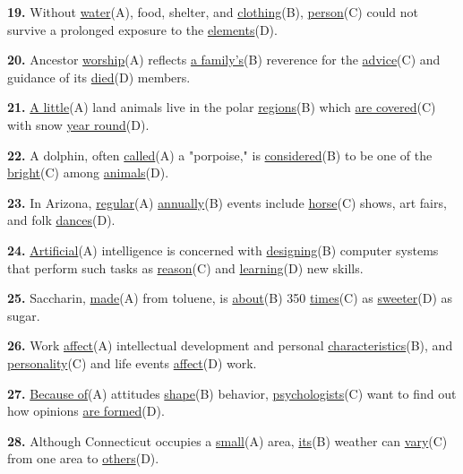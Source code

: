 \documentclass[12pt]{article}
\begin{document}
\par
\vspace{\questionblockgap}
\noindent\textbf{19.} Without \uline{water}(A), food, shelter, and \uline{clothing}(B), \uline{person}(C) could not survive a prolonged exposure to the \uline{elements}(D).
\par
\vspace{\questionblockgap}
\noindent\textbf{20.} Ancestor \uline{worship}(A) reflects \uline{a family's}(B) reverence for the \uline{advice}(C) and guidance of its \uline{died}(D) members.
\par
\vspace{\questionblockgap}
\noindent\textbf{21.} \uline{A little}(A) land animals live in the polar \uline{regions}(B) which \uline{are covered}(C) with snow \uline{year round}(D).
\par
\vspace{\questionblockgap}
\noindent\textbf{22.} A dolphin, often \uline{called}(A) a "porpoise," is \uline{considered}(B) to be one of the \uline{bright}(C) among \uline{animals}(D).
\par
\vspace{\questionblockgap}
\noindent\textbf{23.} In Arizona, \uline{regular}(A) \uline{annually}(B) events include \uline{horse}(C) shows, art fairs, and folk \uline{dances}(D).
\par
\vspace{\questionblockgap}
\noindent\textbf{24.} \uline{Artificial}(A) intelligence is concerned with \uline{designing}(B) computer systems that perform such tasks as \uline{reason}(C) and \uline{learning}(D) new skills.
\par
\vspace{\questionblockgap}
\noindent\textbf{25.} Saccharin, \uline{made}(A) from toluene, is \uline{about}(B) 350 \uline{times}(C) as \uline{sweeter}(D) as sugar.
\par
\vspace{\questionblockgap}
\noindent\textbf{26.} Work \uline{affect}(A) intellectual development and personal \uline{characteristics}(B), and \uline{personality}(C) and life events \uline{affect}(D) work.
\par
\vspace{\questionblockgap}
\noindent\textbf{27.} \uline{Because of}(A) attitudes \uline{shape}(B) behavior, \uline{psychologists}(C) want to find out how opinions \uline{are formed}(D).
\par
\vspace{\questionblockgap}
\noindent\textbf{28.} Although Connecticut occupies a \uline{small}(A) area, \uline{its}(B) weather can \uline{vary}(C) from one area to \uline{others}(D).
\end{document}
